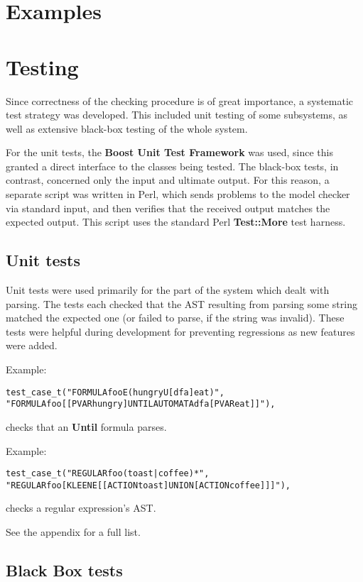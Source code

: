 \documentclass[11pt]{article}
\theoremstyle{definition}
\begin{document}
\section{Examples}


\section{Testing}

Since correctness of the checking procedure is of great importance, a
systematic test strategy was developed. This included unit testing of some
subsystems, as well as extensive black-box testing of the whole system.

For the unit tests, the \textbf{Boost Unit Test Framework} was used, since this
granted a direct interface to the classes being tested. The black-box tests, in
contrast, concerned only the input and ultimate output. For this reason, a
separate script was written in Perl, which sends problems to the model checker
via standard input, and then verifies that the received output matches the
expected output. This script uses the standard Perl \textbf{Test::More} test
harness.

\subsection{Unit tests}

Unit tests were used primarily for the part of the system which dealt with
parsing. The tests each checked that the AST resulting from parsing some string
matched the expected one (or failed to parse, if the string was invalid). These
tests were helpful during development for preventing regressions as new
features were added.

Example:
\begin{alltt}
test_case_t("FORMULA foo { E(hungry U[dfa] eat) }",
            "FORMULA foo { [[PVAR hungry] UNTIL {AUTOMATA dfa} [PVAR eat]] }"),
\end{alltt}
checks that an \textbf{Until} formula parses.

Example:
\begin{alltt}
test_case_t("REGULAR foo { (toast|coffee)* }",
            "REGULAR foo { [KLEENE [[ACTION toast] UNION [ACTION coffee]]] }"),
\end{alltt}
checks a regular expression's AST.

See the appendix for a full list.

\subsection{Black Box tests}
\end{document}
